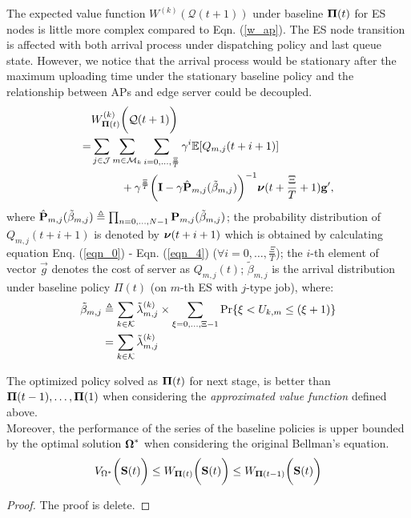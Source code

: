 The expected value function $W^{(k)}(\mathcal{Q}(t+1))$ under baseline $\boldsymbol{\Pi}(t)$ for ES nodes is little more complex compared to Eqn. (\ref{w_ap}).
The ES node transition is affected with both arrival process under dispatching policy and last queue state.
However, we notice that the arrival process would be stationary after the maximum uploading time under the stationary baseline policy and the relationship between APs and edge server could be decoupled.
\begin{align}
    &W^{(k)}_{\boldsymbol{\Pi}(t)}\bigg(\mathcal{Q}(t+1)\bigg)
    \nonumber\\
    =& \sum_{j\in\mathcal{J}}\sum_{m\in\mathcal{M}_{k}}\sum_{i=0,\dots,\frac{\Xi}{T}} \gamma^{i} \mathbb{E}[ Q_{m,j}({t+i+1}) ]
    \nonumber\\
    &~~~~~~~~+ \gamma^{\frac{\Xi}{T}} \bigg( \mathbf{I} - \gamma \hat{\mathbf{P}}_{m,j}(\tilde{\beta}_{m,j}) \bigg)^{-1} \boldsymbol{\nu}({t+\frac{\Xi}{T}+1}) \mathbf{g}',
\end{align}
where $\hat{\mathbf{P}}_{m,j}(\tilde{\beta}_{m,j}) \triangleq \prod_{n=0,\dots,N-1} \mathbf{P}_{m,j}(\tilde{\beta}_{m,j})$;
the probability distribution of $Q_{m,j}({t+i+1})$ is denoted by $\boldsymbol{\nu}({t+i+1})$ which is obtained by calculating equation Enq. (\ref{eqn_0}) - Eqn. (\ref{eqn_4}) ($\forall i=0,\dots,\frac{\Xi}{T}$);
the $i$-th element of vector $\vec{g}$ denotes the cost of server as $Q_{m,j}(t)$;
$\tilde{\beta}_{m,j}$ is the arrival distribution under baseline policy $\Pi(t)$ (on $m$-th ES with $j$-type job), where:
\begin{align}
    \tilde{\beta}_{m,j} &\triangleq \sum_{k\in\mathcal{K}} \tilde{\lambda}^{(k)}_{m,j} \times \sum_{\xi=0,\dots,\Xi-1} \Pr\{ \xi<U_{k,m}\leq(\xi+1) \}
        \nonumber\\
    ~~~~&= \sum_{k\in\mathcal{K}} \tilde{\lambda}^{(k)}_{m,j}
\end{align}

\begin{lemma}
    The optimized policy solved as $\boldsymbol{\Pi}(t)$ for next stage, is better than $\boldsymbol{\Pi}(t-1), \dots, \boldsymbol{\Pi}(1)$ when considering the \emph{approximated value function} defined above.
    \\
    Moreover, the performance of the series of the baseline policies is upper bounded by the optimal solution $\boldsymbol{\Omega}^*$ when considering the original Bellman's equation.
    $$
        V_{\Omega^*}\bigg(\mathbf{S}(t)\bigg)
        \leq W_{\boldsymbol{\Pi}(t)}\bigg(\mathbf{S}(t)\bigg)
        \leq W_{\boldsymbol{\Pi}(t-1)}\bigg(\mathbf{S}(t)\bigg)
    $$
\end{lemma}
\begin{proof}
    The proof is delete.
\end{proof}

